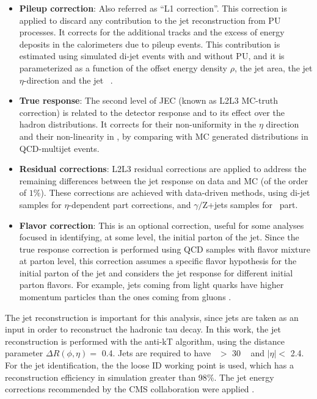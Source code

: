 \begin{itemize}
 \item \textbf{Pileup correction}: Also referred as ``L1 correction''. This correction is applied to discard any 
 contribution to the jet reconstruction from PU processes. It corrects for the additional tracks and 
 the excess of energy deposits in the calorimeters due to pileup events. This contribution 
 is estimated using simulated di-jet events with and without PU, and it is 
 parameterized as a function of the offset energy density $\rho$, the jet area, the jet $\eta$-direction 
 and the jet \pt~\cite{JECpileup}. 
 \item \textbf{True response}: The second level of JEC (known as L2L3 MC-truth correction) is related to 
 the detector response and to its effect over the hadron distributions. It corrects for their 
 non-uniformity in the $\eta$ direction and their non-linearity in \pt, by comparing with MC generated 
 distributions in QCD-multijet events. 
 \item \textbf{Residual corrections}: L2L3 residual corrections are applied to address 
 the remaining differences between the jet response on data and MC (of the order of $1 \%$). These corrections are 
achieved with data-driven methods, using di-jet samples for $\eta$-dependent part corrections,
and $\gamma /$Z+jets samples for \pt~part. 
 \item \textbf{Flavor correction}: This is an optional correction, useful for some analyses 
 focused in identifying, at some level, the initial parton of the jet. Since the true 
 response correction is performed using QCD samples with flavor mixture at parton level, this 
 correction assumes a specific flavor hypothesis for the initial parton of the jet and 
 considers the jet response for different initial parton flavors. For example, jets coming
 from light quarks have higher momentum particles than the ones coming from gluons \cite{JecJet}. 
\end{itemize}


\noindent The jet reconstruction is important for this analysis, since jets are taken 
as an input in order to reconstruct the hadronic tau decay. In this work, the jet 
reconstruction is performed with the anti-kT algorithm, using the distance 
parameter $\Delta R(\phi,\eta) =$ 0.4. Jets are required 
to have \pt~$>$ 30 \GeV~ and $|\eta| <$ 2.4. For the jet identification, the 
the loose ID working point is used, which has a reconstruction efficiency in simulation greater than 98$\%$. The 
jet energy corrections recommended by the CMS collaboration were applied \cite{JetPOG}.

